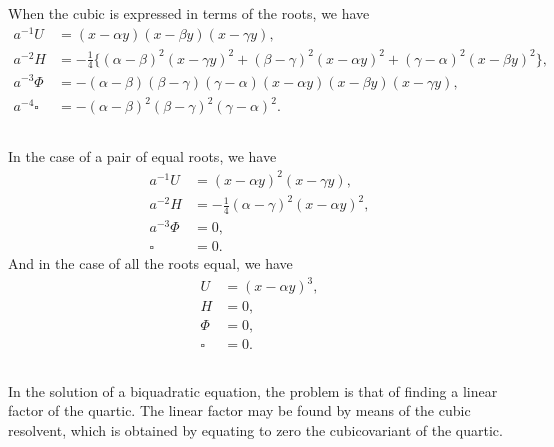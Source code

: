 \documentclass[11pt,a4paper]{book}
\begin{document}
\begin{center}
\subsection{}

When the cubic is expressed in terms of the roots, we have
\begin{align*}
a^{-1}U &= (x - \alpha y)(x - \beta y)(x - \gamma y),\\
a^{-2}H &= -\tfrac{1}{4}\{(\alpha - \beta)^2(x - \gamma y)^2 + (\beta - \gamma)^2(x - \alpha y)^2 + (\gamma - \alpha)^2(x - \beta y)^2\},\\
a^{-3}\Phi &= -(\alpha - \beta)(\beta - \gamma)(\gamma - \alpha)(x - \alpha y)(x - \beta y)(x - \gamma y),\\
a^{-4}\square &= -(\alpha - \beta)^2(\beta - \gamma)^2(\gamma - \alpha)^2.
\end{align*}

\subsection{}

In the case of a pair of equal roots, we have
\begin{align*}
a^{-1}U &= (x - \alpha y)^2(x - \gamma y),\\
a^{-2}H &= -\tfrac{1}{4}(\alpha - \gamma)^2(x - \alpha y)^2,\\
a^{-3}\Phi &= 0,\\
\square &= 0.
\end{align*}
And in the case of all the roots equal, we have
\begin{align*}
U &= (x - \alpha y)^3,\\
H &= 0,\\
\Phi &= 0,\\
\square &= 0.
\end{align*}

\subsection{}

In the solution of a biquadratic equation, the problem is that of finding a linear factor of the quartic. The linear factor may be found by means of the cubic resolvent, which is obtained by equating to zero the cubicovariant of the quartic.

\subsection{}


\end{center}
\end{document}
